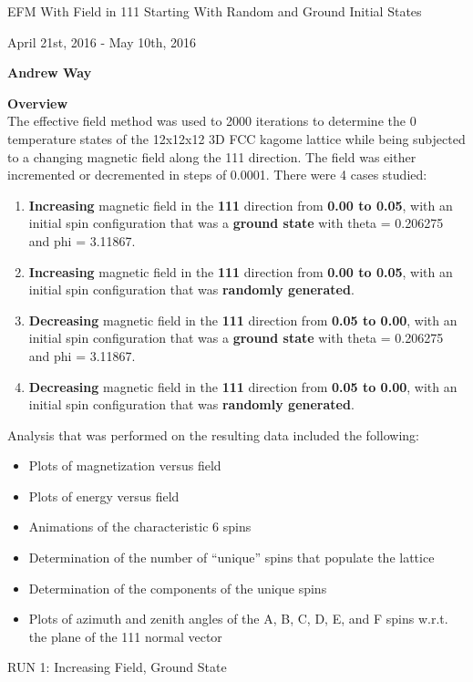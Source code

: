 \documentclass{article}
\begin{document}
\thispagestyle{plain}
\begin{center}
    \Large
    EFM With Field in 111 Starting With Random and Ground Initial States
    
    \vspace{0.4cm}
    \large
    April 21st, 2016 - May 10th, 2016
    
    \vspace{0.4cm}
    \textbf{Andrew Way}
    
    \vspace{0.9cm}
    \textbf{Overview} \\
    \vspace{5mm}
    The effective field method was used to 2000 iterations to determine the 0 temperature states of 
    the 12x12x12 3D FCC kagome lattice while being subjected to a changing magnetic field along the 111 
    direction. The field was either incremented or decremented in steps of 0.0001. 
    There were 4 cases studied:
    \begin{enumerate}
     \item \textbf{Increasing} magnetic field in the \textbf{111} direction from \textbf{0.00 to 0.05},
     with an initial 
     spin configuration that was a \textbf{ground state} with theta = 0.206275 and phi = 3.11867.
     \item \textbf{Increasing} magnetic field in the \textbf{111} direction from \textbf{0.00 to 0.05},
     with an initial 
     spin configuration that was \textbf{randomly generated}.
     \item \textbf{Decreasing} magnetic field in the \textbf{111} direction from \textbf{0.05 to 0.00},
     with an initial
     spin configuration that was a \textbf{ground state} with theta = 0.206275 and phi = 3.11867.
     \item \textbf{Decreasing} magnetic field in the \textbf{111} direction from \textbf{0.05 to 0.00},
     with an initial
     spin configuration that was \textbf{randomly generated}.
    \end{enumerate}
    Analysis that was performed on the resulting data included the following:
    \begin{itemize}
     \item Plots of magnetization versus field
     \item Plots of energy versus field
     \item Animations of the characteristic 6 spins 
     \item Determination of the number of ``unique'' spins that populate the lattice
     \item Determination of the components of the unique spins
     \item Plots of azimuth and zenith angles of the A, B, C, D, E, and F spins w.r.t. the plane of the 111 normal vector 
    \end{itemize}

\end{center}
\pagebreak
\thispagestyle{plain}
\begin{center}
\LARGE
RUN 1: Increasing Field, Ground State
\end{center}
\end{document}
